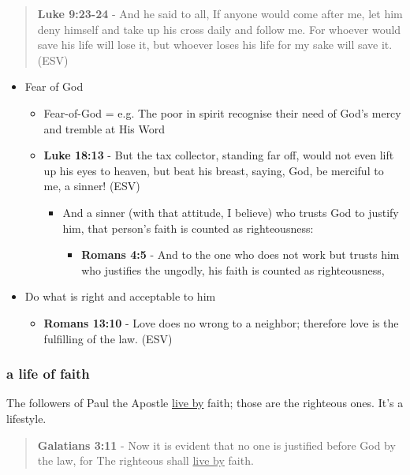 \documentclass[11pt]{article}
\begin{document}
\begin{quote}
\textbf{Luke 9:23-24} - And he said to all, If anyone would come after me, let him deny himself and take up his cross daily and follow me. For whoever would save his life will lose it, but whoever loses his life for my sake will save it. (ESV)
\end{quote}

\begin{itemize}
\item Fear of God
\begin{itemize}
\item Fear-of-God = e.g. The poor in spirit recognise their need of God's mercy and tremble at His Word
\item \textbf{Luke 18:13} - But the tax collector, standing far off, would not even lift up his eyes to heaven, but beat his breast, saying, God, be merciful to me, a sinner! (ESV)
\begin{itemize}
\item And a sinner (with that attitude, I believe) who trusts God to justify him, that person's faith is counted as righteousness:
\begin{itemize}
\item \textbf{Romans 4:5} - And to the one who does not work but trusts him who justifies the ungodly, his faith is counted as righteousness,
\end{itemize}
\end{itemize}
\end{itemize}
\item Do what is right and acceptable to him
\begin{itemize}
\item \textbf{Romans 13:10} - Love does no wrong to a neighbor; therefore love is the fulfilling of the law. (ESV)
\end{itemize}
\end{itemize}

\subsubsection{a life of faith}
\label{sec:org08e50c4}
The followers of Paul the Apostle \uline{live by} faith; those are the righteous ones. It's a lifestyle.

\begin{quote}
\textbf{Galatians 3:11} - Now it is evident that no one is justified before God by the law, for The righteous shall \uline{live by} faith.
\end{quote}
\end{document}
